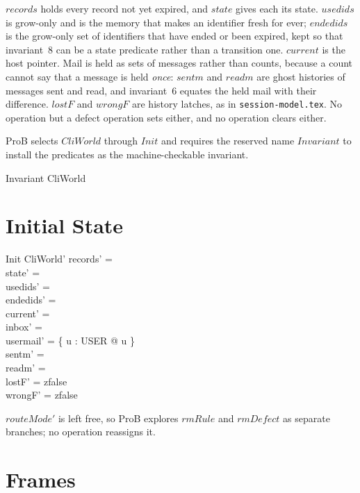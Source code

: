\documentclass[a4paper,10pt,fleqn]{article}
\begin{document}
$records$ holds every record not yet expired, and $state$ gives each its
state.  $usedids$ is grow-only and is the memory that makes an
identifier fresh for ever; $endedids$ is the grow-only set of
identifiers that have ended or been expired, kept so that invariant~8
can be a state predicate rather than a transition one.  $current$ is
the host pointer.  Mail is held as sets of messages rather than counts,
because a count cannot say that a message is held \emph{once}: $sentm$
and $readm$ are ghost histories of messages sent and read, and
invariant~6 equates the held mail with their difference.  $lostF$ and
$wrongF$ are history latches, as in \texttt{session-model.tex}.  No
operation but a defect operation sets either, and no operation clears
either.

ProB selects $CliWorld$ through $Init$ and requires the reserved name
$Invariant$ to install the predicates as the machine-checkable
invariant.

\begin{schema}{Invariant}
  CliWorld
\end{schema}

\section{Initial State}

\begin{schema}{Init}
  CliWorld'
  \where
  records' = \emptyset \\
  state' = \emptyset \\
  usedids' = \emptyset \\
  endedids' = \emptyset \\
  current' = \emptyset \\
  inbox' = \emptyset \\
  usermail' = \{ u : USER @ u \mapsto \emptyset \} \\
  sentm' = \emptyset \\
  readm' = \emptyset \\
  lostF' = zfalse \\
  wrongF' = zfalse
\end{schema}

$routeMode'$ is left free, so ProB explores $rmRule$ and $rmDefect$ as
separate branches; no operation reassigns it.

\section{Frames}
\end{document}
